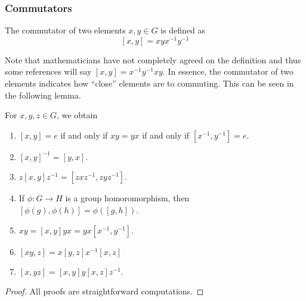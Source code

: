 \documentclass[11pt,leqno,oneside]{amsart}
\begin{document}
\subsubsection*{Commutators}

\begin{defn}
    The commutator of two elements $x,y \in G$ is defined as \[
        [x,y] = xyx^{-1}y^{-1}
    \]
\end{defn}

Note that mathematicians have not completely agreed on the definition and thus
some references will say $[x,y] = x^{-1}y^{-1}xy$. In essence, the commutator
of two elements indicates how ``close'' elements are to commuting. This can be
seen in the following lemma.

\begin{lem}
    For $x,y,z \in G$, we obtain
    \begin{enumerate}[label=(\alph*)]
        \item $[x,y] = e$ if and only if $xy=yx$ if and only if $[x^{-1},y^{-1}] = e$.
        \item $[x,y]^{-1} = [y,x]$.
        \item $z[x,y]z^{-1} = [zxz^{-1},zyz^{-1}]$.
        \item If $\phi: G \to H$ is a group homoromorphism, then $[\phi(g),\phi(h)] = \phi([g,h])$.
        \item $xy = [x,y]yx = yx[x^{-1},y^{-1}]$.
        \item $[xy,z] = x[y,z]x^{-1}[x,z]$
        \item $[x,yz] = [x,y]y[x,z]z^{-1}$.
    \end{enumerate}
\end{lem}
\begin{proof}
    All proofs are straightforward computations.
\end{proof}
\end{document}
